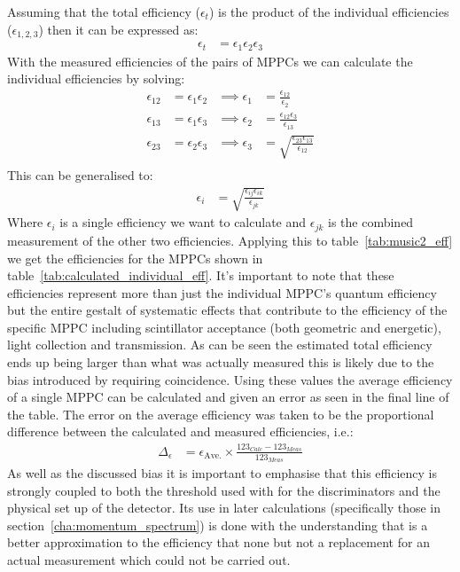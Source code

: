 Assuming that the total efficiency (\( \epsilon_t \)) is the product of the individual efficiencies (\( \epsilon_{1,2,3} \)) then it can be expressed as:
\begin{align}
  \epsilon_t &= \epsilon_1  \epsilon_2  \epsilon_3
\end{align}
With the measured efficiencies of the pairs of MPPCs we can calculate the individual efficiencies by solving:
\begin{align*}
  \epsilon_{12} &= \epsilon_{1} \epsilon_{2} &\implies   \epsilon_{1}  &= \frac{\epsilon_{12}}{\epsilon_{2}}                       \\
  \epsilon_{13} &= \epsilon_{1} \epsilon_{3} &\implies   \epsilon_{2}  &= \frac{\epsilon_{12}\epsilon_{3}}{\epsilon_{13}}          \\
  \epsilon_{23} &= \epsilon_{2} \epsilon_{3} &\implies   \epsilon_{3}  &= \sqrt{\frac{\epsilon_{23}\epsilon_{13}}{\epsilon_{12}}}  \\
\end{align*} 
This can be generalised to:
\begin{align}
  \epsilon_{i} &= \sqrt{\frac{\epsilon_{ij}\epsilon_{ik}}{\epsilon_{jk}}} \label{equ:individual_eff}
\end{align}
Where \( \epsilon_i \) is a single efficiency we want to calculate and \( \epsilon_{jk} \) is the combined measurement of the other two efficiencies. Applying this to table~\ref{tab:music2_eff} we get the efficiencies for the MPPCs shown in table~\ref{tab:calculated_individual_eff}. It's important to note that these efficiencies represent more than just the individual MPPC's quantum efficiency but the entire gestalt of systematic effects that contribute to the efficiency of the specific MPPC including scintillator acceptance (both geometric and energetic), light collection and transmission. As can be seen the estimated total efficiency ends up being larger than what was actually measured this is likely due to the bias introduced by requiring coincidence. Using these values the average efficiency of a single MPPC can be calculated and given an error as seen in the final line of the table. The error on the average efficiency was taken to be the proportional difference between the calculated and measured efficiencies, i.e.:
\begin{align}
  \Delta_\epsilon &= \epsilon_{\text{Ave.}} \times \frac{123_{Calc} - 123_{Meas}}{123_{Meas}} \label{equ:ave_eff_error}
\end{align}
As well as the discussed bias it is important to emphasise that this efficiency is strongly coupled to both the threshold used with for the discriminators and the physical set up of the detector. Its use in later calculations (specifically those in section~\ref{cha:momentum_spectrum}) is done with the understanding that is a better approximation to the efficiency that none but not a replacement for an actual measurement which could not be carried out.

